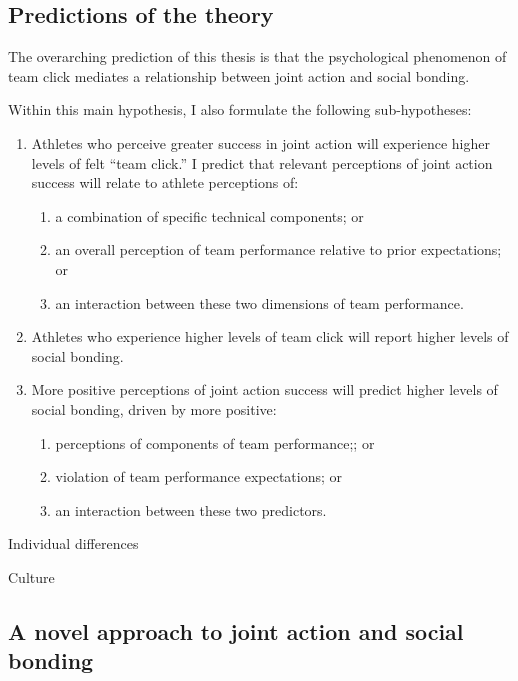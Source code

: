 \begin{CJK}{UTF8}{gbsn}
\section{Predictions of the theory}


    The overarching prediction of this thesis is that the psychological phenomenon of team click mediates a relationship between joint action and social bonding.

    Within this main hypothesis, I also formulate the following sub-hypotheses:
    \begin{enumerate}
      \item Athletes who perceive greater success in joint action will experience higher levels of felt ``team click.'' I predict that relevant perceptions of joint action success will relate to athlete perceptions of:
        \begin{enumerate}
          \item a combination of specific technical components; or
          \item an overall perception of team performance relative to prior expectations; or
          \item an interaction between these two dimensions of team performance.
        \end{enumerate}
      \item Athletes who experience higher levels of team click will report higher levels of social bonding.
      \item More positive perceptions of joint action success will predict higher levels of social bonding, driven by more positive:
      \begin{enumerate}
        \item perceptions of components of team performance;; or
        \item violation of team performance expectations; or
        \item an interaction between these two predictors.
      \end{enumerate}
    \end{enumerate}



Individual differences



Culture






\subsection{A novel approach to joint action and social bonding}


\end{CJK}

